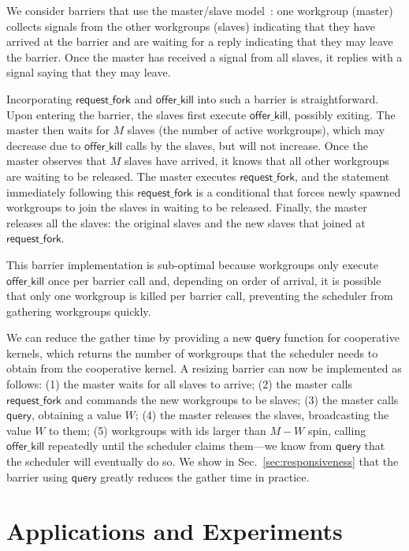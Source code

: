 \documentclass[sigconf]{acmart}
\newcommand{\mysec}{Sec.~}
\newcommand{\offerfork}{\mathsf{request\_fork}}
\newcommand{\offerkill}{\mathsf{offer\_kill}}
\newcommand{\keyword}[1]{\mathsf{#1}}
\begin{document}
{We consider barriers that use the master/slave model~\cite{XF10}: one
workgroup (master) collects signals from the other workgroups (slaves)
indicating that they have arrived at the barrier and are waiting for a
reply indicating that they may leave the barrier. Once the master has
received a signal from all slaves, it replies with a signal saying that
they may leave.

Incorporating $\offerfork$ and $\offerkill$ into such a barrier is
straightforward. Upon entering the barrier, the slaves first execute
$\offerkill$, possibly exiting. The master then waits for $M$ slaves
(the number of active workgroups), which may decrease due to
$\offerkill$ calls by the slaves, but will not increase. Once the
master observes that $M$ slaves have arrived, it knows that all other
workgroups are waiting to be released. The master executes
$\offerfork$, and the statement immediately following this
$\offerfork$ is a conditional that forces newly spawned workgroups to
join the slaves in waiting to be released. Finally, the master
releases all the slaves: the original slaves and the new slaves that
joined at $\offerfork$.

This barrier implementation is sub-optimal because workgroups only
execute $\offerkill$ once per barrier call and, depending on order of
arrival, it is possible that only one workgroup is killed per barrier
call, preventing the scheduler from gathering workgroups quickly.

We can reduce the gather time by providing a new
$\keyword{query}$ function for cooperative kernels, which returns the
number of workgroups that the scheduler needs to obtain from the
cooperative kernel.
%
%
A resizing barrier can now be implemented as follows: (1) the master
waits for all slaves to arrive; (2) the master calls $\offerfork$ and
commands the new workgroups to be slaves; (3) the master calls
$\keyword{query}$, obtaining a value $W$; (4) the master releases the
slaves, broadcasting the value $W$ to them; (5) workgroups with ids
larger than $M-W$ spin, calling $\offerkill$ repeatedly until the
scheduler claims them---we know from $\keyword{query}$ that the
scheduler will eventually do so.
We show in
\mysec\ref{sec:responsiveness} that the barrier using $\keyword{query}$ greatly
reduces the gather time in practice.


\section{Applications and Experiments}\label{sec:experiments}

}
\end{document}
